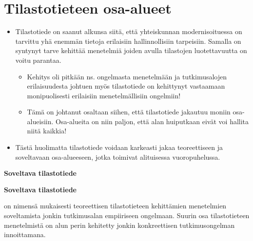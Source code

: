 \documentclass[
]{book}
\providecommand{\tightlist}{%
  \setlength{\itemsep}{0pt}\setlength{\parskip}{0pt}}
\begin{document}
\hypertarget{alaluku34}{%
\section{Tilastotieteen osa-alueet}\label{alaluku34}}

\begin{itemize}
\tightlist
\item
  Tilastotiede on saanut alkunsa siitä, että yhteiskunnan modernisoituessa on tarvittu yhä enemmän tietoja erilaisiin hallinnollisiin tarpeisiin. Samalla on syntynyt tarve kehittää menetelmiä joiden avulla tilastojen luotettavuutta on voitu parantaa.

  \begin{itemize}
  \tightlist
  \item
    Kehitys oli pitkään ns. ongelmasta menetelmään ja tutkimusalojen erilaisuudesta johtuen myös tilastotiede on kehittynyt vastaamaan monipuolisesti erilaisiin menetelmällisiin ongelmiin!
  \item
    Tämä on johtanut osaltaan siihen, että tilastotiede jakautuu moniin osa-alueisiin. Osa-alueita on niin paljon, että alan huiputkaan eivät voi hallita niitä kaikkia!
  \end{itemize}
\item
  Tästä huolimatta tilastotiede voidaan karkeasti jakaa teoreettiseen ja soveltavaan osa-alueeseen, jotka toimivat alituisessa vuoropuhelussa.
\end{itemize}

\textbf{Soveltava tilastotiede}

\begin{defblock}{}
\textbf{Soveltava tilastotiede}

on nimensä mukaisesti teoreettisen tilastotieteen kehittämien menetelmien soveltamista jonkin tutkimusalan empiiriseen ongelmaan. Suurin osa tilastotieteen menetelmistä on alun perin kehitetty jonkin konkreettisen tutkimusongelman innoittamana.

\end{defblock}
\end{document}
